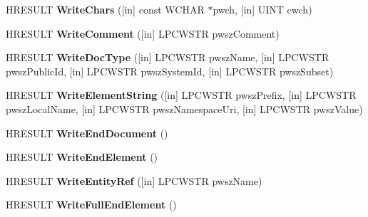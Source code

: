 \begin{DoxyCompactItemize}
\item 
\mbox{\label{interface_i_xml_writer_a3d4904409e2db8c9fdfe98c49a8422ff}} 
H\+R\+E\+S\+U\+LT {\bfseries Write\+Chars} (\mbox{[}in\mbox{]} const W\+C\+H\+AR $\ast$pwch, \mbox{[}in\mbox{]} U\+I\+NT cwch)
\item 
\mbox{\label{interface_i_xml_writer_a3172cc1c2cdc96c2d571617df02f52f0}} 
H\+R\+E\+S\+U\+LT {\bfseries Write\+Comment} (\mbox{[}in\mbox{]} L\+P\+C\+W\+S\+TR pwsz\+Comment)
\item 
\mbox{\label{interface_i_xml_writer_ab154c2118240afcd1b1241f1de11b83a}} 
H\+R\+E\+S\+U\+LT {\bfseries Write\+Doc\+Type} (\mbox{[}in\mbox{]} L\+P\+C\+W\+S\+TR pwsz\+Name, \mbox{[}in\mbox{]} L\+P\+C\+W\+S\+TR pwsz\+Public\+Id, \mbox{[}in\mbox{]} L\+P\+C\+W\+S\+TR pwsz\+System\+Id, \mbox{[}in\mbox{]} L\+P\+C\+W\+S\+TR pwsz\+Subset)
\item 
\mbox{\label{interface_i_xml_writer_a426a5da5bdadd47cf27fab453f38d150}} 
H\+R\+E\+S\+U\+LT {\bfseries Write\+Element\+String} (\mbox{[}in\mbox{]} L\+P\+C\+W\+S\+TR pwsz\+Prefix, \mbox{[}in\mbox{]} L\+P\+C\+W\+S\+TR pwsz\+Local\+Name, \mbox{[}in\mbox{]} L\+P\+C\+W\+S\+TR pwsz\+Namespace\+Uri, \mbox{[}in\mbox{]} L\+P\+C\+W\+S\+TR pwsz\+Value)
\item 
\mbox{\label{interface_i_xml_writer_a5bb69fb06f5704e9e97c0fcab29f91ac}} 
H\+R\+E\+S\+U\+LT {\bfseries Write\+End\+Document} ()
\item 
\mbox{\label{interface_i_xml_writer_a3ce60c5ada392f0221198dd09516bafb}} 
H\+R\+E\+S\+U\+LT {\bfseries Write\+End\+Element} ()
\item 
\mbox{\label{interface_i_xml_writer_a791f57c8a9cd922284ffda12f387b07c}} 
H\+R\+E\+S\+U\+LT {\bfseries Write\+Entity\+Ref} (\mbox{[}in\mbox{]} L\+P\+C\+W\+S\+TR pwsz\+Name)
\item 
\mbox{\label{interface_i_xml_writer_a5297e0cbd9d15b1dbf233f964549d1c1}} 
H\+R\+E\+S\+U\+LT {\bfseries Write\+Full\+End\+Element} ()
\item 
\mbox{\label{interface_i_xml_writer_a717b5b9071b19ad6d6ad495003c49210}} 

\end{DoxyCompactItemize}
